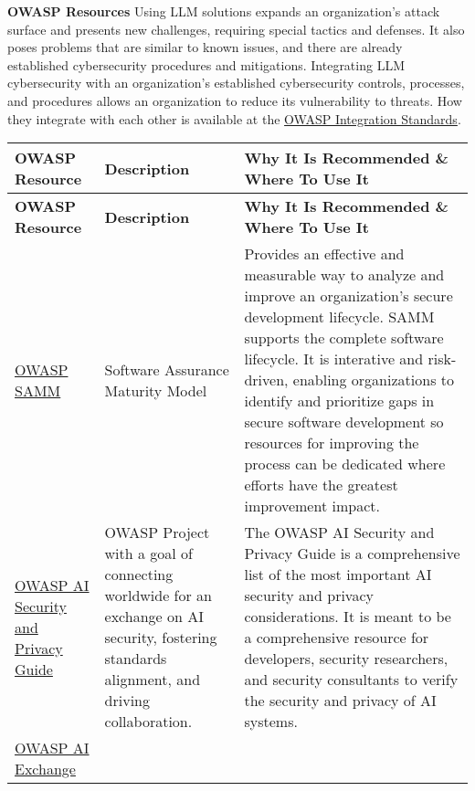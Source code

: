 \textbf{OWASP Resources}
Using LLM solutions expands an organization's attack surface and presents new
challenges, requiring special tactics and defenses. It also poses problems that
are similar to known issues, and there are already established cybersecurity
procedures and mitigations. Integrating LLM cybersecurity with an organization's
established cybersecurity controls, processes, and procedures allows an
organization to reduce its vulnerability to threats. How they integrate with
each other is available at the
\href{https://owasp.org/www-project-integration-standards/}{OWASP Integration Standards}.
\setlength\LTleft{0pt}
\setlength\LTright{0pt}
\begin{longtable}[c]{|p{}|p{}|p{}|}
  \hline
  \rowcolor{owasplightpurple}
  \textbf{OWASP Resource} &
  \textbf{Description} &
  \textbf{Why It Is Recommended \& Where To Use It} \\
  \hline
  \endfirsthead
  \hline
  \rowcolor{owasplightpurple}
  \textbf{OWASP Resource} &
  \textbf{Description} &
  \textbf{Why It Is Recommended \& Where To Use It} \\
  \hline
  \endhead
  \endfoot
  \href{https://owasp.org/www-project-samm/}{OWASP SAMM}&
  Software Assurance Maturity Model &
  Provides an effective and measurable way to analyze and improve an
  organization's secure development lifecycle. SAMM supports the complete
  software lifecycle. It is interative and risk-driven, enabling organizations
  to identify and prioritize gaps in secure software development so resources
  for improving the process can be dedicated where efforts have the greatest
  improvement impact. \\
  \hline
  \href{https://owasp.org/www-project-ai-security-and-privacy-guide/}{OWASP AI Security and Privacy Guide} &
  OWASP Project with a goal of connecting worldwide for an exchange on AI
  security, fostering standards alignment, and driving collaboration. &
  The OWASP AI Security and Privacy Guide is a comprehensive list of the most
  important AI security and privacy considerations. It is meant to be a
  comprehensive resource for developers, security researchers, and security
  consultants to verify the security and privacy of AI systems. \\
  \hline
  \href{https://owasp.org/www-project-ai-security/}{OWASP AI Exchange} &

\end{longtable}

